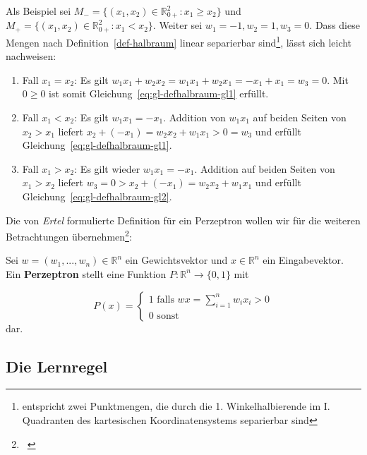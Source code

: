 \noindent
Als Beispiel sei $M_- = \{(x_1, x_2) \in  \mathbb{R}_{0+}^2: x_1 \geq x_2\}$ und $M_+=\{(x_1, x_2) \in  \mathbb{R}_{0+}^2: x_1 < x_2\}$.
Weiter sei $w_1 = -1, w_2 = 1, w_3 = 0$.
Dass diese Mengen nach Definition~\ref{def-halbraum} linear separierbar sind\footnote{entspricht zwei Punktmengen, die durch die 1. Winkelhalbierende im I. Quadranten des kartesischen Koordinatensystems separierbar sind}, lässt sich leicht nachweisen:

\begin{enumerate}
    \item Fall $x_1 = x_2$: Es gilt $w_1x_1 + w_2x_2 = w_1x_1 + w_2x_1 = -x_1 + x_1 = w_3 = 0$. Mit $0 \geq 0$ ist somit Gleichung~\ref{eq:gl-defhalbraum-gl1} erfüllt.
    \item Fall $x_1 < x_2$: Es gilt $w_1x_1 = -x_1$. Addition von $w_1x_1$ auf beiden Seiten von $x_2 > x_1$ liefert $x_2 + (-x_1) = w_2x_2 + w_1x_1 > 0 = w_3$ und erfüllt Gleichung~\ref{eq:gl-defhalbraum-gl1}.
    \item Fall $x_1 > x_2$: Es gilt wieder $w_1x_1 = -x_1$. Addition auf beiden Seiten von $x_1 > x_2$ liefert $w_3 = 0 > x_2 + (-x_1) = w_2x_2 + w_1x_1$ und erfüllt Gleichung~\ref{eq:gl-defhalbraum-gl2}.
\end{enumerate}


\noindent
Die von \textit{Ertel} formulierte Definition für ein Perzeptron wollen wir für die weiteren Betrachtungen übernehmen\footnote{
    ~\cite[212, ``Definition 8.3``; Hervorhebung i.O.]{Ert21a}
}:

\begin{definition}
\noindent
Sei $w = (w_1, ..., w_n) \in  \mathbb{R}^n$ ein Gewichtsvektor und $x \in  \mathbb{R}^n$ ein Eingabevektor. Ein \textbf{Perzeptron} stellt eine Funktion $P:  \mathbb{R}^n \to \{0, 1\}$ mit

\begin{equation}
P(x) = \begin{cases}
            1 \text{ falls } wx = \sum^n_{i=1} w_ix_i >0 \\
            0 \text{ sonst }
\end{cases}
\end{equation}
\noindent
dar.

\end{definition}

\subsection{Die Lernregel}\label{sec:lernregel}

